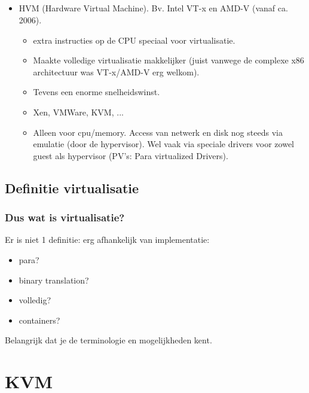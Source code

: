 \subsection {}
\begin{styleframe}
    \frametitle{}
\begin{itemize}
	\item HVM (Hardware Virtual Machine). Bv. Intel VT-x en AMD-V (vanaf ca. 2006).
	\pause
	\begin{itemize}
		\item extra instructies op de CPU speciaal voor virtualisatie.
		\pause
		\item Maakte volledige virtualisatie makkelijker (juist vanwege de complexe x86 architectuur was VT-x/AMD-V erg welkom).
		\pause
		\item Tevens een enorme snelheidswinst.
		\pause
		\item Xen, VMWare, KVM, ...
		\pause
		\item Alleen voor cpu/memory. Access van netwerk en disk nog steeds via emulatie (door de hypervisor). Wel vaak via speciale drivers voor zowel guest als hypervisor (PV's: Para virtualized Drivers).
	\end{itemize}
\end{itemize}
\end{styleframe}

\subsection {Definitie virtualisatie}
\begin{styleframe}
    \frametitle{Dus wat is virtualisatie?}
\pause
Er is niet 1 definitie: erg afhankelijk van implementatie:
\pause
\begin{itemize}
	\item para?
	\item binary translation?
	\item volledig?
	\item containers?
\end{itemize}
\pause
Belangrijk dat je de terminologie en mogelijkheden kent.
\end{styleframe}

\section{KVM}
